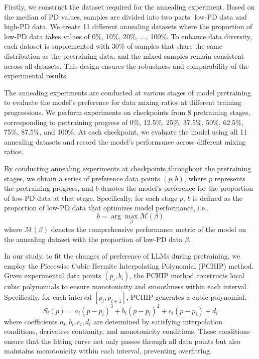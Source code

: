 \documentclass[11pt]{article}
\begin{document}
Firstly, we construct the dataset required for the annealing experiment. Based on the median of PD values, samples are divided into two parts: low-PD data and high-PD data. We create 11 different annealing datasets where the proportion of low-PD data takes values of 0\%, 10\%, 20\%, ..., 100\%. To enhance data diversity, each dataset is supplemented with 30\% of samples that share the same distribution as the pretraining data, and the mixed samples remain consistent across all datasets. This design ensures the robustness and comparability of the experimental results.

The annealing experiments are conducted at various stages of model pretraining to evaluate the model's preference for data mixing ratios at different training progressions. We perform experiments on checkpoints from 8 pretraining stages, corresponding to pertraining progress of 0\%, 12.5\%, 25\%, 37.5\%, 50\%, 62.5\%, 75\%, 87.5\%, and 100\%. At each checkpoint, we evaluate the model using all 11 annealing datasets and record the model's performance across different mixing ratios.

By conducting annealing experiments at checkpoints throughout the pretraining stages, we obtain a series of preference data points \((p, b)\), where \( p \) represents the pretraining progress, and \( b \) denotes the model's preference for the proportion of low-PD data at that stage. Specifically, for each stage \( p \), \( b \) is defined as the proportion of low-PD data that optimizes model performance, i.e.,
\begin{equation}
    b = \arg\max_{\beta} \mathcal{M}(\beta)
\end{equation}
where \(\mathcal{M}(\beta)\) denotes the comprehensive performance metric of the model on the annealing dataset with the proportion of low-PD data \( \beta \).

In our study, to fit the changes of preference of LLMs during pretraining, we employ the Piecewise Cubic Hermite Interpolating Polynomial (PCHIP) method. Given experimental data points \((p_i, b_i)\), the PCHIP method constructs local cubic polynomials to ensure monotonicity and smoothness within each interval. Specifically, for each interval \([p_i, p_{i+1}]\), PCHIP generates a cubic polynomial:
\begin{equation}
    S_i(p) = a_i(p - p_i)^3 + b_i(p - p_i)^2 + c_i(p - p_i) + d_i
\end{equation}
where coefficients \(a_i, b_i, c_i, d_i\) are determined by satisfying interpolation conditions, derivative continuity, and monotonicity conditions. These conditions ensure that the fitting curve not only passes through all data points but also maintains monotonicity within each interval, preventing overfitting.
\end{document}
